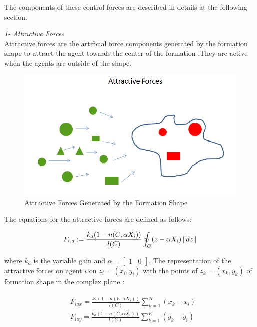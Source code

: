 The components of these  control forces are described in details at the following section. \newline

\textit{			1- Attractive Forces} \\ 
Attractive forces are the artificial force components generated by the formation shape to attract the agent towards the center of the formation .They are active when the agents are outside of the shape. 

\begin{figure}[H]
\caption{Attractive Forces Generated by the Formation Shape}
\centering
\includegraphics[scale = 0.60]{attractive_forces}
\end{figure}	

The equations for the attractive forces are defined as follows:			

\begin{equation}
F_{i,a} := \frac{k_a (1-n(C,\alpha X_i))}{l(C)} \oint_C(z-\alpha X_i)\left\lVert dz\right\rVert
\end{equation}

where $k_a$ is the variable gain and $\alpha = \begin{bmatrix}
1 & 0
		\end{bmatrix}$. The representation of the attractive forces on agent $i$ on $z_i = (x_i, y_i)$ with the points of  $z_k = (x_k,y_k)$ of formation shape in the complex plane \cite{17}:

\begin{align}
\begin{split}
& F_{iax} =\frac{k_a (1-n(C,\alpha X_i))}{l(C)}  \sum_{k=1}^{K} (x_k  - x_i)\\
& F_{iay} =\frac{k_a (1-n(C,\alpha X_i))}{l(C)}  \sum_{k=1}^{K} (y_k  - y_i)\\
\end{split}
\end{align}
			
